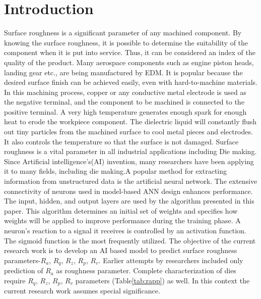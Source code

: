 \documentclass[suppldata]{interact}
\begin{document}
\section{Introduction}
Surface roughness is a significant parameter of any machined component. By knowing the surface roughness, it is possible to determine the suitability of the component when it is put into service. Thus, it can be considered an index of the quality of the product.  Many aerospace components such as engine piston heads, landing gear etc., are being manufactured by EDM. It is popular because the desired surface finish can be achieved easily, even with hard-to-machine materials. In this machining process, copper or any conductive metal electrode is used as the negative terminal, and the component to be machined is connected to the positive terminal. A very high temperature generates enough spark for enough heat to erode the workpiece component. The dielectric liquid will constantly flush out tiny particles from the machined surface to cool metal pieces and electrodes. It also controls the temperature so that the surface is not damaged. 
Surface roughness is a vital parameter in all industrial applications including Die making. Since Artificial intelligence's(AI) invention, many researchers have been applying it to many fields, including die making.A popular method for extracting information from unstructured data is the artificial neural network. The extensive connectivity of neurons used in model-based ANN design enhances performance.  The input, hidden, and output layers are used by the algorithm presented in this paper. This algorithm determines an initial set of weights and specifies how weights will be applied to improve performance during the training phase. A neuron's reaction to a signal it receives is controlled by an activation function. The sigmoid function is the most frequently utilized. The objective of the current research work is to develop an AI based model to predict surface roughness parameters-$R_a$, $R_q$, $R_z$, $R_p$, $R_v$. Earlier attempts by researchers included only prediction of $R_a$ as roughness parameter. Complete characterization of dies require $R_q$, $R_z$, $R_p$, $R_v$ parameters (Table\ref{tab:rapp}) as well. In this context the current research work assumes special significance.
\end{document}
